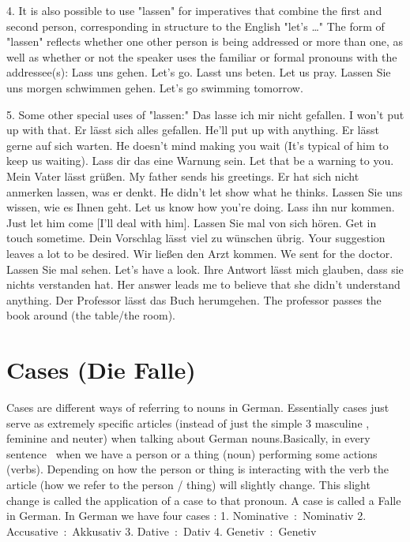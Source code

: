 \documentclass[a4paper,12pt]{article}
\begin{document}
\begin{adjustwidth}{2em}{0pt}
\begin{adjustwidth}{3em}{0pt}
	4. It is also possible to use "lassen" for imperatives that combine the
	first and second person, corresponding in structure to the English
	"let's \ldots" The form of "lassen" reflects whether one other person is being
	addressed or more than one, as well as whether or not the speaker uses the
	familiar or formal pronouns with the addressee(s): Lass uns gehen. 	Let's
	go.  Lasst uns beten. 	Let us pray.  Lassen Sie uns morgen schwimmen gehen.
	Let's go swimming tomorrow.

    5. Some other special uses of "lassen:"
    Das lasse ich mir nicht gefallen. 	I won't put up with that.
    Er lässt sich alles gefallen. 	He'll put up with anything.
    Er lässt gerne auf sich warten. 	He doesn't mind making you wait (It's typical of him to keep us waiting).
    Lass dir das eine Warnung sein. 	Let that be a warning to you.
    Mein Vater lässt grüßen. 	My father sends his greetings.
    Er hat sich nicht anmerken lassen, was er denkt. 	He didn't let show what he thinks.
    Lassen Sie uns wissen, wie es Ihnen geht. 	Let us know how you're doing.
    Lass ihn nur kommen. 	Just let him come [I'll deal with him].
    Lassen Sie mal von sich hören. 	Get in touch sometime.
    Dein Vorschlag lässt viel zu wünschen übrig. 	Your suggestion leaves a lot to be desired.
    Wir ließen den Arzt kommen. 	We sent for the doctor.
    Lassen Sie mal sehen. 	Let's have a look.
    Ihre Antwort lässt mich glauben, dass sie nichts verstanden hat. 	Her answer leads me to believe that she didn't understand anything.
    Der Professor lässt das Buch herumgehen. 	The professor passes the book around (the table/the room).

\end{adjustwidth}


\end{adjustwidth}

\pagebreak

\section{Cases (Die Falle)}
\label{sec:cases}
Cases are different ways of referring to nouns in German. Essentially cases just
serve as extremely specific articles (instead of just the simple 3 masculine ,
feminine and neuter) when talking about German nouns.Basically, in every
sentence  when we have a person or a thing (noun) performing some actions
(verbs). Depending on how the person or thing is interacting with the verb the
article (how we refer to the person / thing) will slightly change. This slight
change is called the application of a case to that pronoun.
A case is called a Falle in German.
In German we have four cases :
1. Nominative : Nominativ
2. Accusative : Akkusativ
3. Dative : Dativ
4. Genetiv : Genetiv
\end{document}
